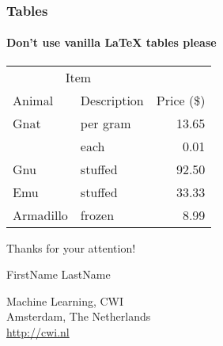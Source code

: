 \documentclass[11pt,aspectratio=169]{beamer}
\begin{document}
\begin{frame}

	\frametitle{Tables}
	\framesubtitle{Don't use vanilla \LaTeX{}  tables please}
	
		\begin{center}
			\begin{tabular}{@{}llr@{}}
				\toprule\multicolumn{2}{c}{Item} \\
				\cmidrule(r){1-2}Animal & Description & Price (\$)\\
				\midrule
				Gnat  & per gram  & 13.65 \\
				& each      & 0.01 \\
				Gnu   & stuffed   & 92.50 \\
				Emu   & stuffed   & 33.33 \\
				Armadillo & frozen & 8.99 \\
				\bottomrule
			\end{tabular}
		\end{center}

\end{frame}

\begin{closingframe}{Thanks for your attention!}

FirstName LastName\\

\medskip

Machine Learning, CWI\\
Amsterdam, The Netherlands\\
\url{http://cwi.nl}

\end{closingframe}
\end{document}
